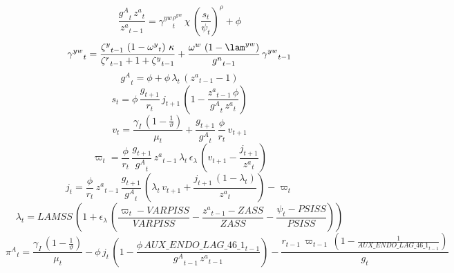 \begin{dmath}
\frac{{{g^A}}_{t}\, {{z^a}}_{t}}{{{z^a}}_{t-1}}={{\gamma^{yw}}}_{t}^{{{\rho^{yw}}}}\, {{\chi}}\, \left(\frac{{{s}}_{t}}{{{\psi}}_{t}}\right)^{{{\rho}}}+{{\phi}}
\end{dmath}
\begin{dmath}
{{\gamma^{yw}}}_{t}=\frac{{{\zeta^{y}}}_{t-1}\, \left(1-{{\omega^{y}}}_{t}\right)\, {{\kappa}}}{{{\zeta^{r}}}_{t-1}+1+{{\zeta^{y}}}_{t-1}}+\frac{{{\omega^w}}\, \left(1-{{\lam^{yw}}}\right)}{{{g^n}}_{t-1}}\, {{\gamma^{yw}}}_{t-1}
\end{dmath}
\begin{dmath}
{{g^A}}_{t}={{\phi}}+{{\phi}}\, {{\lambda}}_{t}\, \left({{z^a}}_{t-1}-1\right)
\end{dmath}
\begin{dmath}
{{s}}_{t}={{\phi}}\, \frac{{{g}}_{t+1}}{{{r}}_{t}}\, {{j}}_{t+1}\, \left(1-\frac{{{z^a}}_{t-1}\, {{\phi}}}{{{g^A}}_{t}\, {{z^a}}_{t}}\right)
\end{dmath}
\begin{dmath}
{{v}}_{t}=\frac{{{\gamma_I}}\, \left(1-\frac{1}{{{\vartheta}}}\right)}{{{\mu}}_{t}}+\frac{{{g}}_{t+1}}{{{g^A}}_{t}}\, \frac{{{\phi}}}{{{r}}_{t}}\, {{v}}_{t+1}
\end{dmath}
\begin{dmath}
{{\varpi}}_{t}=\frac{{{\phi}}}{{{r}}_{t}}\, \frac{{{g}}_{t+1}}{{{g^A}}_{t}}\, {{z^a}}_{t-1}\, {{\lambda}}_{t}\, {{\epsilon_{\lambda}}}\, \left({{v}}_{t+1}-\frac{{{j}}_{t+1}}{{{z^a}}_{t}}\right)
\end{dmath}
\begin{dmath}
{{j}}_{t}=\frac{{{\phi}}}{{{r}}_{t}}\, {{z^a}}_{t-1}\, \frac{{{g}}_{t+1}}{{{g^A}}_{t}}\, \left({{\lambda}}_{t}\, {{v}}_{t+1}+\frac{{{j}}_{t+1}\, \left(1-{{\lambda}}_{t}\right)}{{{z^a}}_{t}}\right)-{{\varpi}}_{t}
\end{dmath}
\begin{dmath}
{{\lambda}}_{t}={{LAMSS}}\, \left(1+{{\epsilon_{\lambda}}}\, \left(\frac{{{\varpi}}_{t}-{{VARPISS}}}{{{VARPISS}}}-\frac{{{z^a}}_{t-1}-{{ZASS}}}{{{ZASS}}}-\frac{{{\psi}}_{t}-{{PSISS}}}{{{PSISS}}}\right)\right)
\end{dmath}
\begin{dmath}
{{\pi^{A}}}_{t}=\frac{{{\gamma_I}}\, \left(1-\frac{1}{{{\vartheta}}}\right)}{{{\mu}}_{t}}-{{\phi}}\, {{j}}_{t}\, \left(1-\frac{{{\phi}}\, {AUX\_ENDO\_LAG\_46\_1}_{t-1}}{{{g^A}}_{t-1}\, {{z^a}}_{t-1}}\right)-\frac{{{r}}_{t-1}\, {{\varpi}}_{t-1}\, \left(1-\frac{1}{{AUX\_ENDO\_LAG\_46\_1}_{t-1}}\right)}{{{g}}_{t}}
\end{dmath}
